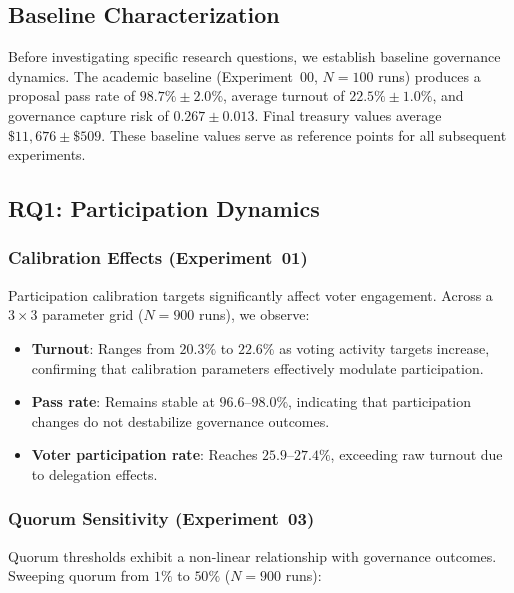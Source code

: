 
\subsection{Baseline Characterization}

Before investigating specific research questions, we establish baseline governance dynamics. The academic baseline (Experiment~00, $N=100$ runs) produces a proposal pass rate of $98.7\% \pm 2.0\%$, average turnout of $22.5\% \pm 1.0\%$, and governance capture risk of $0.267 \pm 0.013$. Final treasury values average $\$11{,}676 \pm \$509$. These baseline values serve as reference points for all subsequent experiments.

\subsection{RQ1: Participation Dynamics}

\subsubsection{Calibration Effects (Experiment~01)}

Participation calibration targets significantly affect voter engagement. Across a $3 \times 3$ parameter grid ($N=900$ runs), we observe:

\begin{itemize}
    \item \textbf{Turnout}: Ranges from $20.3\%$ to $22.6\%$ as voting activity targets increase, confirming that calibration parameters effectively modulate participation.
    \item \textbf{Pass rate}: Remains stable at $96.6$--$98.0\%$, indicating that participation changes do not destabilize governance outcomes.
    \item \textbf{Voter participation rate}: Reaches $25.9$--$27.4\%$, exceeding raw turnout due to delegation effects.
\end{itemize}

\subsubsection{Quorum Sensitivity (Experiment~03)}

Quorum thresholds exhibit a non-linear relationship with governance outcomes. Sweeping quorum from $1\%$ to $50\%$ ($N=900$ runs):

